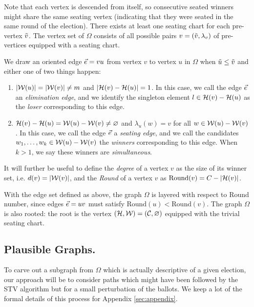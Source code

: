 Note that each vertex is descended from itself, so consecutive seated winners might share the same seating vertex (indicating that they were seated in the same round of the election).
There exists at least one seating chart for each pre-vertex $\tilde{v}$. The vertex set of $\Omega$ consists of all possible pairs $v = (\tilde{v}, \lambda_v)$ of pre-vertices equipped with a seating chart.

We draw an oriented edge $\ve = vu$ from vertex $v$ to vertex $u$ in $\Omega$ when $\tilde{u}\leq\tilde{v}$ and either one of two things happen:%
\begin{enumerate}
    \item $|\mathcal{W}(u)|= |\mathcal{W}(v)|\neq m$ and $|\mathcal{H}(v)-\mathcal{H}(u)|=1$. %
	    In this case, we call the edge $\ve$ an \emph{elimination edge}, and we identify the singleton element $l\in\mathcal{H}(v)-\mathcal{H}(u)$ as the \emph{loser} corresponding to this edge.\medskip
    \item $\mathcal{H}(v)-\mathcal{H}(u) = \mathcal{W}(u)-\mathcal{W}(v)\neq\varnothing$ and $\lambda_u(w)=v$ for all $w\in \mathcal{W}(u)-\mathcal{W}(v)$.%
	    In this case, we call the edge $\ve$ a \emph{seating edge}, and we call the candidates $w_1, \ldots, w_k \in \mathcal{W}(u)-\mathcal{W}(v)$ the \emph{winners} corresponding to this edge. When $k>1$, we say these winners are \emph{simultaneous}.
\end{enumerate}

It will further be useful to define the \emph{degree} of a vertex $v$ as the size of its winner set, i.e. $d(v)= |\mathcal{W}(v)|$, and the \emph{Round} of a vertex $v$ as $\text{Round}(v) = C-|\mathcal{H}(v)|$.

With the edge set defined as above, the graph $\Omega$ is layered with respect to Round number, since edges $\ve = uv$ must satisfy $\text{Round}(u)<\text{Round}(v)$. 
The graph $\Omega$ is also rooted: the root is the vertex $(\mathcal{H},\mathcal{W})=(\mathcal{C},\varnothing)$ equipped with the trivial seating chart.

\subsection{Plausible Graphs.}\label{sec:plausible}

To carve out a subgraph from $\Omega$ which is actually descriptive of a given election, our approach will be to consider paths which might have been followed by the STV algorithm but for a small perturbation of the ballots.
We keep a lot of the formal details of this process for Appendix \ref{sec:appendix}.

